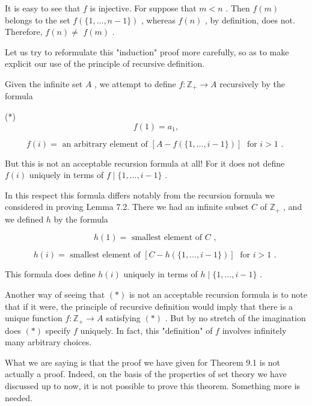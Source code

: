 It is easy to see that \(f\) is injective. For suppose that \(m < n\) . Then \(f\left( m\right)\) belongs to the set \(f\left( {\{ 1,\ldots ,n - 1\} }\right)\) , whereas \(f\left( n\right)\) , by definition, does not. Therefore, \(f\left( n\right)  \neq\)  \(f\left( m\right)\) .

Let us try to reformulate this "induction" proof more carefully, so as to make explicit our use of the principle of recursive definition.

Given the infinite set \(A\) , we attempt to define \(f : {\mathbb{Z}}_{ + } \rightarrow  A\) recursively by the formula

(*)
\[
f\left( 1\right)  = {a}_{1},
\]

\[
f\left( i\right)  = \text{ an arbitrary element of }\left\lbrack  {A - f\left( {\{ 1,\ldots ,i - 1\} }\right) }\right\rbrack  \;\text{ for }i > 1\text{ . }
\]

But this is not an acceptable recursion formula at all! For it does not define \(f\left( i\right)\) uniquely in terms of \(f \mid  \{ 1,\ldots ,i - 1\}\) .

In this respect this formula differs notably from the recursion formula we considered in proving Lemma 7.2. There we had an infinite subset \(C\) of \({\mathbb{Z}}_{ + }\) , and we defined \(h\) by the formula

\[
h\left( 1\right)  = \text{ smallest element of }C\text{ , }
\]

\[
h\left( i\right)  = \text{ smallest element of }\left\lbrack  {C - h\left( {\{ 1,\ldots ,i - 1\} }\right) }\right\rbrack  \;\text{ for }i > 1\text{ . }
\]

This formula does define \(h\left( i\right)\) uniquely in terms of \(h \mid  \{ 1,\ldots ,i - 1\}\) .

Another way of seeing that \(\left( *\right)\) is not an acceptable recursion formula is to note that if it were, the principle of recursive definition would imply that there is a unique function \(f : {\mathbb{Z}}_{ + } \rightarrow  A\) satisfying \(\left( *\right)\) . But by no stretch of the imagination does \(\left( *\right)\) specify \(f\) uniquely. In fact, this "definition" of \(f\) involves infinitely many arbitrary choices.

What we are saying is that the proof we have given for Theorem 9.1 is not actually a proof. Indeed, on the basis of the properties of set theory we have discussed up to now, it is not possible to prove this theorem. Something more is needed.


